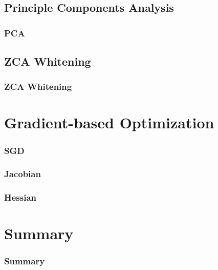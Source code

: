\documentclass{beamer}
\begin{document}
\subsection{Principle Components Analysis}

\begin{frame}
    \frametitle{PCA}
\end{frame}

\subsection{ZCA Whitening}

\begin{frame}
    \frametitle{ZCA Whitening}
\end{frame}

\section{Gradient-based Optimization}

\begin{frame}
    \frametitle{SGD}
\end{frame}

\begin{frame}
    \frametitle{Jacobian}
\end{frame}

\begin{frame}
    \frametitle{Hessian}
\end{frame}

\section{Summary}

\begin{frame}
    \frametitle{Summary}
\end{frame}
\end{document}
